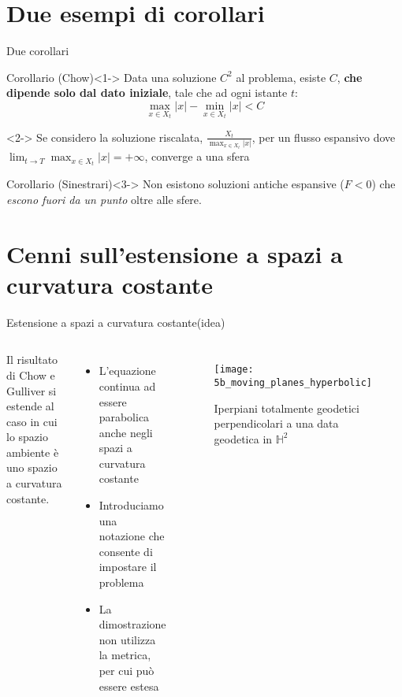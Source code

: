 \section{Due esempi di corollari}

\begin{frame}{Due corollari}{}
	\begin{block}{Corollario (Chow)}<1->
		Data una soluzione $C^2$ al problema, esiste $C$, \textbf{che dipende solo dal dato iniziale}, tale che ad ogni istante $t$:
		\begin{equation}
			\max_{x\in X_t} |x| - \min_{x\in X_t} |x| <C
		\end{equation}
	\end{block}
	\begin{block}{}<2->
		Se considero la soluzione riscalata, $\frac{X_t}{\max_{x\in X_t} |x|}$, per un flusso espansivo dove $\lim_{t\rightarrow T}\max_{x\in X_t} |x| = +\infty$, converge a una sfera 
	\end{block}
	\begin{block}{Corollario (Sinestrari)}<3->
		Non esistono soluzioni antiche espansive ($F<0$) che \textit{escono fuori da un punto} oltre alle sfere. 
	\end{block}
\end{frame}

\section{Cenni sull'estensione a spazi a curvatura costante}
\begin{frame}{Estensione a spazi a curvatura costante}{(idea)}
	\begin{columns}
		Il risultato di Chow e Gulliver si estende al caso in cui lo spazio ambiente è uno spazio a curvatura costante. 
		\begin{itemize}
			\item L'equazione continua ad essere parabolica anche negli spazi a curvatura costante
			\item Introduciamo una notazione che consente di impostare il problema
			\item La dimostrazione non utilizza la metrica, per cui può essere estesa		
		\end{itemize}
		\begin{figure}
			\begin{center}
				\texttt{[image: 5b\_moving\_planes\_hyperbolic]}
				\caption{Iperpiani totalmente geodetici perpendicolari a una data geodetica in $\mathbb{H}^2$}
			\end{center}
		\end{figure}
	\end{columns}
\end{frame}
